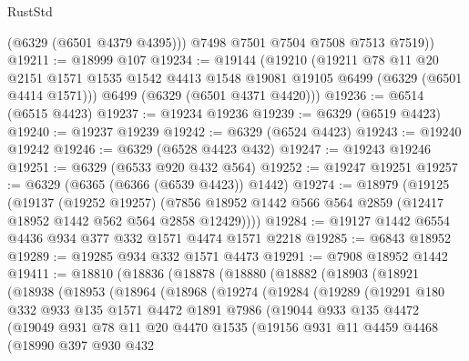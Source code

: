 \begin{lexlean}{RustStd}
\begin{coremodule}
{{          (@6329 (@6501 @4379 @4395)))
        @7498
        @7501
        @7504
        @7508
        @7513
        @7519))
@19211 := @18999 @107
@19234 := @19144
    (@19210
      (@19211
        @78
        @11
        @20
        @2151
        @1571
        @1535
        @1542
        @4413
        @1548
        @19081
        @19105
        @6499
        (@6329 (@6501 @4414 @1571)))
      @6499
      (@6329 (@6501 @4371 @4420)))
@19236 := @6514 (@6515 @4423)
@19237 := @19234 @19236
@19239 := @6329 (@6519 @4423)
@19240 := @19237 @19239
@19242 := @6329 (@6524 @4423)
@19243 := @19240 @19242
@19246 := @6329 (@6528 @4423 @432)
@19247 := @19243 @19246
@19251 := @6329 (@6533 @920 @432 @564)
@19252 := @19247 @19251
@19257 := @6329 (@6365 (@6366 (@6539 @4423)) @1442)
@19274 := @18979
    (@19125
      (@19137
        (@19252 @19257)
        (@7856 @18952 @1442 @566 @564 @2859 (@12417 @18952 @1442 @562 @564 @2858 @12429))))
@19284 := @19127 @1442 @6554 @4436 @934 @377 @332 @1571 @4474 @1571 @2218
@19285 := @6843 @18952
@19289 := @19285 @934 @332 @1571 @4473
@19291 := @7908 @18952 @1442
@19411 := @18810
    (@18836
      (@18878
        (@18880
          (@18882
            (@18903
              (@18921
                (@18938
                  (@18953
                    (@18964
                      (@18968
                        (@19274
                          (@19284
                            (@19289
                              (@19291
                                @180
                                @332
                                @933
                                @135
                                @1571
                                @4472
                                @1891
                                @7986
                                (@19044
                                  @933
                                  @135
                                  @4472
                                  (@19049
                                    @931
                                    @78
                                    @11
                                    @20
                                    @4470
                                    @1535
                                    (@19156
                                      @931
                                      @11
                                      @4459
                                      @4468
                                      (@18990
                                        @397
                                        @930
                                        @432
}}
\end{coremodule}
\end{lexlean}
